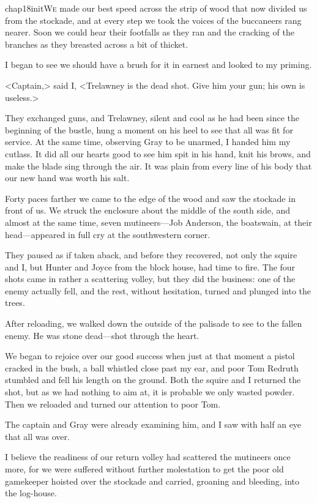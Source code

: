  
\lettrine{chap18initW}{e} made our best speed across the strip of wood that now divided us from the stockade, and at every step we took the voices of the buccaneers rang nearer. Soon we could hear their footfalls as they ran and the cracking of the branches as they breasted across a bit of thicket.

I began to see we should have a brush for it in earnest and looked to my priming.

<Captain,> said I, <Trelawney is the dead shot. Give him your gun; his own is useless.>

They exchanged guns, and Trelawney, silent and cool as he had been since the beginning of the bustle, hung a moment on his heel to see that all was fit for service. At the same time, observing Gray to be unarmed, I handed him my cutlass. It did all our hearts good to see him spit in his hand, knit his brows, and make the blade sing through the air. It was plain from every line of his body that our new hand was worth his salt.

Forty paces farther we came to the edge of the wood and saw the stockade in front of us. We struck the enclosure about the middle of the south side, and almost at the same time, seven mutineers—Job Anderson, the boatswain, at their head—appeared in full cry at the southwestern corner.

They paused as if taken aback, and before they recovered, not only the squire and I, but Hunter and Joyce from the block house, had time to fire. The four shots came in rather a scattering volley, but they did the business: one of the enemy actually fell, and the rest, without hesitation, turned and plunged into the trees.

After reloading, we walked down the outside of the palisade to see to the fallen enemy. He was stone dead—shot through the heart.

We began to rejoice over our good success when just at that moment a pistol cracked in the bush, a ball whistled close past my ear, and poor Tom Redruth stumbled and fell his length on the ground. Both the squire and I returned the shot, but as we had nothing to aim at, it is probable we only wasted powder. Then we reloaded and turned our attention to poor Tom.

The captain and Gray were already examining him, and I saw with half an eye that all was over.

I believe the readiness of our return volley had scattered the mutineers once more, for we were suffered without further molestation to get the poor old gamekeeper hoisted over the stockade and carried, groaning and bleeding, into the log-house.


